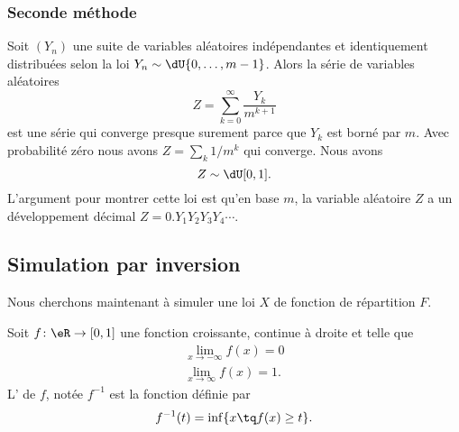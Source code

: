 \subsubsection{Seconde méthode}

Soit \( (Y_n)\) une suite de variables aléatoires indépendantes et identiquement distribuées selon la loi \( Y_n\sim\dU\{ 0,\ldots,m-1 \}\). Alors la série de variables aléatoires
\begin{equation}
    Z=\sum_{k=0}^{\infty}\frac{ Y_k }{ m^{k+1} }
\end{equation}
est une série qui converge presque surement parce que \( Y_k\) est borné par \( m\). Avec probabilité zéro nous avons \( Z=\sum_k1/m^k\) qui converge. Nous avons
\begin{equation}
    Z\sim\dU\mathopen[ 0 , 1 \mathclose].
\end{equation}
L'argument pour montrer cette loi est qu'en base \( m\), la variable aléatoire \( Z\) a un développement décimal \( Z=0.Y_1Y_2Y_3Y_4\cdots\).

\subsection{Simulation par inversion}

Nous cherchons maintenant à simuler une loi \( X\) de fonction de répartition \( F\).

\begin{definition}
    Soit \( f\colon \eR\to \mathopen[ 0 , 1 \mathclose]\) une fonction croissante, continue à droite et telle que
    \begin{subequations}
        \begin{align}
            \lim_{x\to -\infty} f(x)=0\\
            \lim_{x\to \infty} f(x)=1.
        \end{align}
    \end{subequations}
    L' de \( f\), notée \( f^{-1}\) est la fonction définie par
    \begin{equation}
        f^{-1}(t)=\inf\{ x\tq f(x)\geq t \}.
    \end{equation}
\end{definition}


